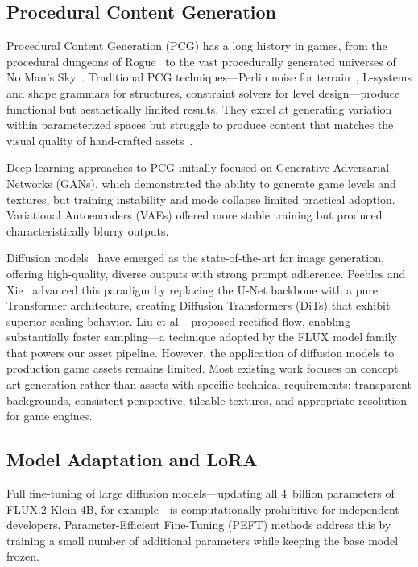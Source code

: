 \documentclass[conference]{IEEEtran}
\begin{document}
\subsection{Procedural Content Generation}

Procedural Content Generation (PCG) has a long history in games, from the
procedural dungeons of Rogue~\cite{toy1980rogue} to the vast procedurally
generated universes of No Man's Sky~\cite{hellogames2016nomanssky}.
Traditional PCG techniques---Perlin noise for
terrain~\cite{perlin1985imagesynthesizer}, L-systems and shape grammars for
structures, constraint solvers for level design---produce functional but
aesthetically limited results. They excel at generating variation within
parameterized spaces but struggle to produce content that matches the
visual quality of hand-crafted assets~\cite{togelius2011searchbased}.

Deep learning approaches to PCG initially focused on Generative Adversarial
Networks (GANs), which demonstrated the ability to generate game levels and
textures, but training instability and mode collapse limited practical
adoption. Variational Autoencoders (VAEs) offered more stable training but
produced characteristically blurry outputs.

Diffusion models~\cite{ho2020ddpm,rombach2022ldm} have emerged as the
state-of-the-art for image generation, offering high-quality, diverse
outputs with strong prompt adherence. Peebles and
Xie~\cite{peebles2023dit} advanced this paradigm by replacing the U-Net
backbone with a pure Transformer architecture, creating Diffusion
Transformers (DiTs) that exhibit superior scaling behavior. Liu et
al.~\cite{liu2023rectifiedflow} proposed rectified flow, enabling
substantially faster sampling---a technique adopted by the FLUX model
family that powers our asset pipeline. However, the application of
diffusion models to production game assets remains limited. Most existing
work focuses on concept art generation rather than assets with specific
technical requirements: transparent backgrounds, consistent perspective,
tileable textures, and appropriate resolution for game engines.

\subsection{Model Adaptation and LoRA}

Full fine-tuning of large diffusion models---updating all 4~billion
parameters of FLUX.2 Klein 4B, for example---is computationally prohibitive
for independent developers. Parameter-Efficient Fine-Tuning (PEFT) methods
address this by training a small number of additional parameters while
keeping the base model frozen.
\end{document}
